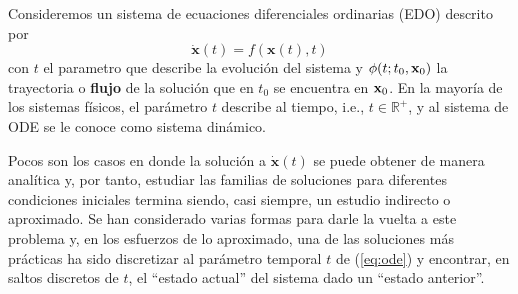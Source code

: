Consideremos un sistema de ecuaciones diferenciales ordinarias (EDO) descrito por 
\begin{equation}
\dot{\mathbf{x}}(t) = f(\mathbf{x}(t),t)
\label{eq:ode}
\end{equation}
con $t$ el parametro que describe la evolución del sistema y $\phi(t;t_0,\mathbf{x}_0)$ la trayectoria o \textbf{flujo} de la solución que en $t_0$ se encuentra en $\mathbf{x}_0$. En la mayoría de los sistemas físicos, el parámetro $t$ describe al tiempo, i.e., $t \in \mathbb{R}^+$, y al sistema de ODE se le conoce como sistema dinámico.

Pocos son los casos en donde la solución a $\dot{\mathbf{x}}(t)$ se puede obtener de manera analítica y, por tanto, estudiar las familias de soluciones para diferentes condiciones iniciales termina siendo, casi siempre, un estudio indirecto o aproximado. Se han considerado varias formas para darle la vuelta a este problema y, en los esfuerzos de lo aproximado, una de las soluciones más prácticas ha sido discretizar al parámetro temporal $t$ de (\ref{eq:ode}) y encontrar, en saltos discretos de $t$, el ``estado actual'' del sistema dado un ``estado anterior''.

